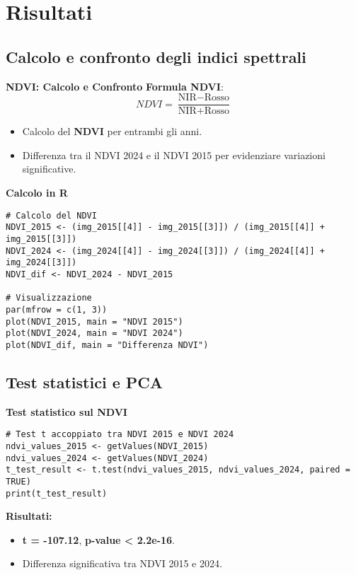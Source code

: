 \documentclass{beamer}
\begin{document}
\section{Risultati}

\subsection{Calcolo e confronto degli indici spettrali}

\begin{frame}{\textbf{NDVI: Calcolo e Confronto}}
\textbf{Formula NDVI}:
\[
NDVI = \frac{\text{NIR} - \text{Rosso}}{\text{NIR} + \text{Rosso}}
\]
\begin{itemize}
    \item Calcolo del \textbf{NDVI} per entrambi gli anni.
    \item Differenza tra il NDVI 2024 e il NDVI 2015 per evidenziare variazioni significative.
\end{itemize}
\end{frame}

\begin{frame}[fragile]{\textbf{Calcolo in R}}
\begin{lstlisting}
# Calcolo del NDVI
NDVI_2015 <- (img_2015[[4]] - img_2015[[3]]) / (img_2015[[4]] + img_2015[[3]])
NDVI_2024 <- (img_2024[[4]] - img_2024[[3]]) / (img_2024[[4]] + img_2024[[3]])
NDVI_dif <- NDVI_2024 - NDVI_2015

# Visualizzazione
par(mfrow = c(1, 3))
plot(NDVI_2015, main = "NDVI 2015")
plot(NDVI_2024, main = "NDVI 2024")
plot(NDVI_dif, main = "Differenza NDVI")
\end{lstlisting}
\end{frame}

\subsection{Test statistici e PCA}

\begin{frame}[fragile]{\textbf{Test statistico sul NDVI}}
\begin{lstlisting}
# Test t accoppiato tra NDVI 2015 e NDVI 2024
ndvi_values_2015 <- getValues(NDVI_2015)
ndvi_values_2024 <- getValues(NDVI_2024)
t_test_result <- t.test(ndvi_values_2015, ndvi_values_2024, paired = TRUE)
print(t_test_result)
\end{lstlisting}
\textbf{Risultati:}
\begin{itemize}
    \item \textbf{t = -107.12}, \textbf{p-value < 2.2e-16}.
    \item Differenza significativa tra NDVI 2015 e 2024.
\end{itemize}
\end{frame}
\end{document}
